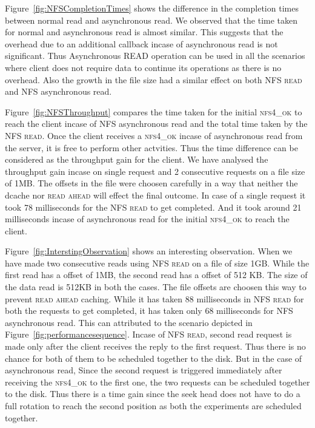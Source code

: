 Figure~\ref{fig:NFSCompletionTimes} shows the  difference in the completion times between normal read and asynchronous read. We observed that the time taken for normal and asynchronous read is almost similar. This suggests that the overhead due to an additional callback incase of asynchronous read is not significant. Thus Asynchronous READ operation can be used in all the scenarios where client does not require data to continue its operations as there is no overhead. Also the growth in the file size had a similar effect on both \textsc{NFS read} and NFS asynchronous read.


Figure~\ref{fig:NFSThroughput} compares the  time taken for the initial \textsc{nfs4\_ok} to reach the client incase of NFS asynchronous read and the total time taken by the \textsc{NFS read}.
Once the client receives a \textsc{nfs4\_ok}  incase of asynchronous read from the server, it is free to perform other actvities. Thus the time difference can be considered as the throughput gain for the client. We have analysed the throughput gain incase on single request and 2 consecutive requests on a file size of 1MB. The offsets in the file were choosen carefully in a way that neither the dcache nor \textsc{read ahead} will effect the final outcome. In case of a single request it took 78 milliseconds for the 
\textsc{NFS read} to get completed. And it took around 21 milliseconds incase of asynchronous read for the initial \textsc{nfs4\_ok}  to reach the client. 



 Figure~\ref{fig:InterstingObservation} shows an interesting observation. When we have made two consecutive reads  using \textsc{NFS read} on a file of size 1GB. While the first read has a offset of 1MB, the second read has a offset of 512 KB. The size of the data read is 512KB in both the cases. The file offsets are choosen this way to prevent \textsc{read ahead} caching. While it has taken 88 milliseconds  in \textsc{NFS read} for both the requests to get completed, it has taken only 68 milliseconds for NFS asynchronous read. This can attributed to the scenario depicted  in   Figure~\ref{fig:performancesequence}. Incase of \textsc{NFS read}, second read request is made only after the client receives the reply to the first request. Thus there is no chance for both of them to be scheduled together to the disk. But in the case of asynchronous read, Since the second request is triggered immediately after receiving the  \textsc{nfs4\_ok}  to the first one, the two requests can be scheduled together to the disk. Thus there is a time gain since the seek head does not have to do a full rotation to reach the second position as both the experiments are scheduled together.    






